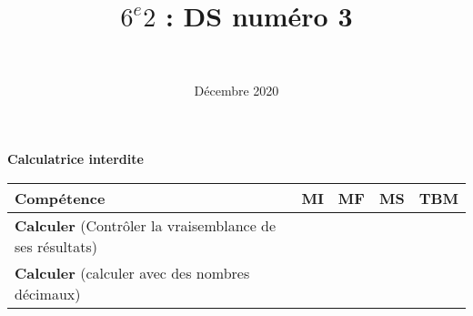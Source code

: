 \documentclass[a4paper,11pt]{exam}
\author{\ }
\date{ Décembre 2020}
\title{$6^e 2$ : DS num\'ero 3}
\begin{document}
%	

	\maketitle
	
\begin{center}
	\textbf{Calculatrice interdite}
\end{center}

\begin{small}
	\begin{center}
		\begin{tabular}{|@{\ }l@{\ }|@{\ }c@{\ }|@{\ }c@{\ }|@{\ }c@{\ }|@{\ }c@{\ }|}
			\hline
			\textbf{Compétence} & \textbf{MI} & \textbf{MF} & \textbf{MS} & \textbf{TBM} \\
			\hline
			\textbf{Calculer} (Contrôler la vraisemblance de ses résultats) &  \ \ & \ \ & \ \ & \ \  \\
			\hline
			\textbf{Calculer} (calculer avec des nombres décimaux)&  \ \ & \ \ & \ \ & \ \  \\
			\hline	
%			 
		\end{tabular}
	\end{center}
\end{small}	

	
	
%	















\label{LastPage}

%
\end{document}
